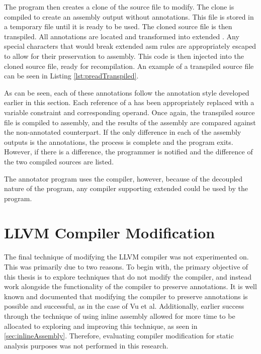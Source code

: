 The program then creates a clone of the source file to modify. The clone is compiled to create an assembly output without annotations. This file is stored in a temporary file until it is ready to be used. The cloned source file is then transpiled. All annotations are located and transformed into extended . Any special characters that would break extended asm rules are appropriately escaped to allow for their preservation to assembly. This code is then injected into the cloned source file, ready for recompilation. An example of a transpiled source file can be seen in Listing \ref{lst:preadTranspiled}.



As can be seen, each of these annotations follow the annotation style developed earlier in this section. Each reference of a  has been appropriately replaced with a variable constraint and corresponding operand. Once again, the transpiled source file is compiled to assembly, and the results of the assembly are compared against the non-annotated counterpart. If the only difference in each of the assembly outputs is the annotations, the process is complete and the program exits. However, if there is a difference, the programmer is notified and the difference of the two compiled sources are listed.

The annotator program uses the  compiler, however, because of the decoupled nature of the program, any compiler supporting extended  could be used by the program. 

\section{LLVM Compiler Modification}
The final technique of modifying the LLVM compiler was not experimented on. This was primarily due to two reasons. To begin with, the primary objective of this thesis is to explore techniques that do not modify the compiler, and instead work alongside the functionality of the compiler to preserve annotations. It is well known and documented that modifying the compiler to preserve annotations is possible and successful, as in the case of Vu et al. \cite{vu2020secure} Additionally, earlier success through the technique of using inline assembly allowed for more time to be allocated to exploring and improving this technique, as seen in \ref{sec:inlineAssembly}. Therefore, evaluating compiler modification for static analysis purposes was not performed in this research.
